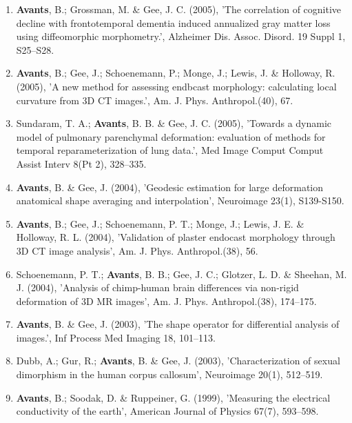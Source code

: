 \documentclass[11pt]{moderncv} %
\begin{document}
\begin{enumerate}
\item  \textbf{Avants}, B.; Grossman, M. \&  Gee, J. C. (2005), 'The correlation of cognitive decline with frontotemporal dementia induced annualized gray matter loss using diffeomorphic morphometry.', Alzheimer Dis. Assoc. Disord. 19 Suppl 1, S25--S28.

\item  \textbf{Avants}, B.; Gee, J.; Schoenemann, P.; Monge, J.; Lewis, J. \&  Holloway, R. (2005), 'A new method for assessing endbcast morphology: calculating local curvature from 3D CT images.', Am. J. Phys. Anthropol.(40), 67.

\item  Sundaram, T. A.; \textbf{Avants}, B. B. \&  Gee, J. C. (2005), 'Towards a dynamic model of pulmonary parenchymal deformation: evaluation of methods for temporal reparameterization of lung data.', Med Image Comput Comput Assist Interv 8(Pt 2), 328--335.

\item  \textbf{Avants}, B. \&  Gee, J. (2004), 'Geodesic estimation for large deformation anatomical shape averaging and interpolation', Neuroimage 23(1), S139-S150.

\item  \textbf{Avants}, B.; Gee, J.; Schoenemann, P. T.; Monge, J.; Lewis, J. E. \&  Holloway, R. L. (2004), 'Validation of plaster endocast morphology through 3D CT image analysis', Am. J. Phys. Anthropol.(38), 56.

\item  Schoenemann, P. T.; \textbf{Avants}, B. B.; Gee, J. C.; Glotzer, L. D. \&  Sheehan, M. J. (2004), 'Analysis of chimp-human brain differences via non-rigid deformation of 3D MR images', Am. J. Phys. Anthropol.(38), 174--175.

\item  \textbf{Avants}, B. \&  Gee, J. (2003), 'The shape operator for differential analysis of images.', Inf Process Med Imaging 18, 101--113.

\item  Dubb, A.; Gur, R.; \textbf{Avants}, B. \&  Gee, J. (2003), 'Characterization of sexual dimorphism in the human corpus callosum', Neuroimage 20(1), 512--519.

\item  \textbf{Avants}, B.; Soodak, D. \&  Ruppeiner, G. (1999), 'Measuring the electrical conductivity of the earth', American Journal of Physics 67(7), 593--598.
\end{enumerate}
\end{document}
